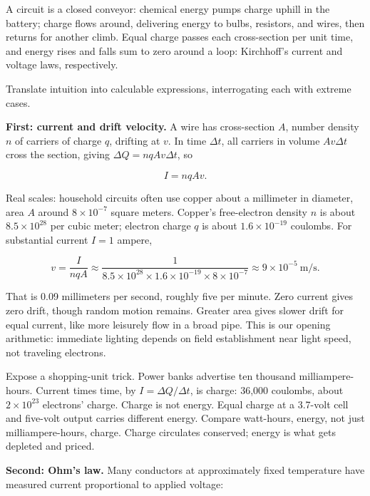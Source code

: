 
\begin{oneline}
A circuit is a closed conveyor: chemical energy pumps charge uphill in the battery; charge flows around, delivering energy to bulbs, resistors, and wires, then returns for another climb. Equal charge passes each cross-section per unit time, and energy rises and falls sum to zero around a loop: Kirchhoff's current and voltage laws, respectively.
\end{oneline}


Translate intuition into calculable expressions, interrogating each with extreme cases.

\textbf{First: current and drift velocity.} A wire has cross-section \(A\), number density \(n\) of carriers of charge \(q\), drifting at \(v\). In time \(\Delta t\), all carriers in volume \(Av\Delta t\) cross the section, giving \(\Delta Q=nqAv\Delta t\), so

\[
I=nqAv.
\]

Real scales: household circuits often use copper about a millimeter in diameter, area \(A\) around \(8\times10^{-7}\) square meters. Copper's free-electron density \(n\) is about \(8.5\times10^{28}\) per cubic meter; electron charge \(q\) is about \(1.6\times10^{-19}\) coulombs. For substantial current \(I=1\) ampere,

\[
v=\frac{I}{nqA}\approx\frac{1}{8.5\times10^{28}\times1.6\times10^{-19}\times8\times10^{-7}}\approx9\times10^{-5}\ \text{m/s}.
\]

That is 0.09 millimeters per second, roughly five per minute. Zero current gives zero drift, though random motion remains. Greater area gives slower drift for equal current, like more leisurely flow in a broad pipe. This is our opening arithmetic: immediate lighting depends on field establishment near light speed, not traveling electrons.

Expose a shopping-unit trick. Power banks advertise ten thousand milliampere-hours. Current times time, by \(I=\Delta Q/\Delta t\), is charge: 36,000 coulombs, about \(2\times10^{23}\) electrons' charge. Charge is not energy. Equal charge at a 3.7-volt cell and five-volt output carries different energy. Compare watt-hours, energy, not just milliampere-hours, charge. Charge circulates conserved; energy is what gets depleted and priced.

\textbf{Second: Ohm's law.} Many conductors at approximately fixed temperature have measured current proportional to applied voltage:

